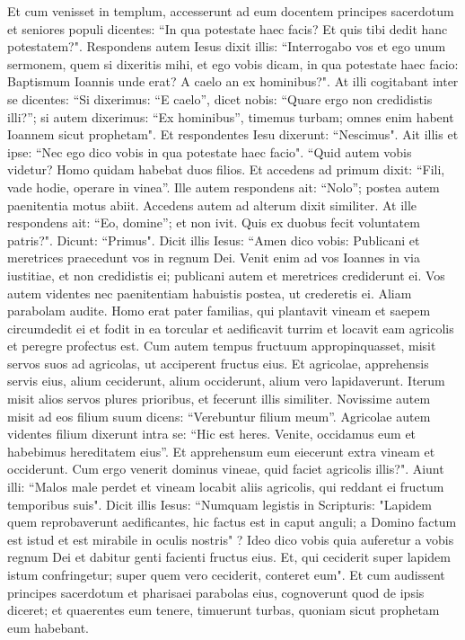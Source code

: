 \begin{biblechapter}
\verse Et cum venisset in templum, accesserunt ad eum docentem principes sacerdotum et seniores populi dicentes: “In qua potestate haec facis? Et quis tibi dedit hanc potestatem?". 
\verse Respondens autem Iesus dixit illis: “Interrogabo vos et ego unum sermonem, quem si dixeritis mihi, et ego vobis dicam, in qua potestate haec facio: 
\verse Baptismum Ioannis unde erat? A caelo an ex hominibus?". At illi cogitabant inter se dicentes: “Si dixerimus: “E caelo”, dicet nobis: “Quare ergo non credidistis illi?”; 
\verse si autem dixerimus: “Ex hominibus”, timemus turbam; omnes enim habent Ioannem sicut prophetam". 
\verse Et respondentes Iesu dixerunt: “Nescimus". Ait illis et ipse: “Nec ego dico vobis in qua potestate haec facio". 
\verse “Quid autem vobis videtur? Homo quidam habebat duos filios. Et accedens ad primum dixit: “Fili, vade hodie, operare in vinea”. 
\verse Ille autem respondens ait: “Nolo”; postea autem paenitentia motus abiit. 
\verse Accedens autem ad alterum dixit similiter. At ille respondens ait: “Eo, domine”; et non ivit. 
\verse Quis ex duobus fecit voluntatem patris?". Dicunt: “Primus". Dicit illis Iesus: “Amen dico vobis: Publicani et meretrices praecedunt vos in regnum Dei. 
\verse Venit enim ad vos Ioannes in via iustitiae, et non credidistis ei; publicani autem et meretrices crediderunt ei. Vos autem videntes nec paenitentiam habuistis postea, ut crederetis ei. 
\verse Aliam parabolam audite. Homo erat pater familias, qui plantavit vineam et saepem circumdedit ei et fodit in ea torcular et aedificavit turrim et locavit eam agricolis et peregre profectus est. 
\verse Cum autem tempus fructuum appropinquasset, misit servos suos ad agricolas, ut acciperent fructus eius.  
\verse Et agricolae, apprehensis servis eius, alium ceciderunt, alium occiderunt, alium vero lapidaverunt. 
\verse Iterum misit alios servos plures prioribus, et fecerunt illis similiter. 
\verse Novissime autem misit ad eos filium suum dicens: “Verebuntur filium meum”. 
\verse Agricolae autem videntes filium dixerunt intra se: “Hic est heres. Venite, occidamus eum et habebimus hereditatem eius”. 
\verse Et apprehensum eum eiecerunt extra vineam et occiderunt. 
\verse Cum ergo venerit dominus vineae, quid faciet agricolis illis?". 
\verse Aiunt illi: “Malos male perdet et vineam locabit aliis agricolis, qui reddant ei fructum temporibus suis". 
\verse Dicit illis Iesus: “Numquam legistis in Scripturis: "Lapidem quem reprobaverunt aedificantes, hic factus est in caput anguli; a Domino factum est istud et est mirabile in oculis nostris" ? 
\verse Ideo dico vobis quia auferetur a vobis regnum Dei et dabitur genti facienti fructus eius. 
\verse Et, qui ceciderit super lapidem istum confringetur; super quem vero ceciderit, conteret eum". 
\verse Et cum audissent principes sacerdotum et pharisaei parabolas eius, cognoverunt quod de ipsis diceret; 
\verse et quaerentes eum tenere, timuerunt turbas, quoniam sicut prophetam eum habebant. 
\end{biblechapter}

